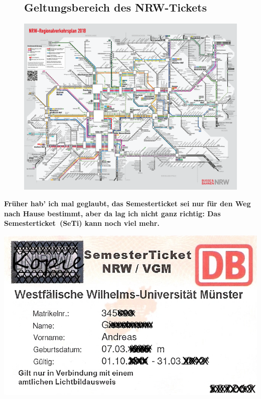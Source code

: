 \begin{multicols*}{2}
\begin{figure}[t]
	\subsection{Geltungsbereich des NRW-Tickets}
	\includegraphics[width=\textwidth]{res/regionalverkehrsplan_nrw.pdf}
\end{figure}
\textbf{Früher hab' ich mal geglaubt, das Semesterticket sei nur für den Weg nach Hause bestimmt, aber da lag ich nicht ganz richtig: Das Semesterticket~(SeTi) kann noch viel mehr.}

\includegraphics[width=\columnwidth]{res/semesterticket.png}


\end{multicols*}
